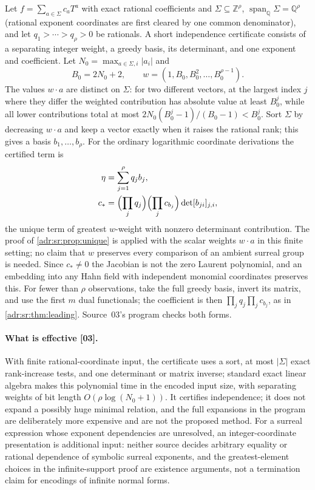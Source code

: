 \documentclass[11pt,letterpaper]{article}
\numberwithin{equation}{section}
\theoremstyle{definition}
\theoremstyle{remark}
\newcommand{\Q}{\mathbb Q}
\newcommand{\Z}{\mathbb Z}
\newcommand{\abs}[1]{\lvert#1\rvert}
\newcommand{\src}[1]{\textup{[#1]}}%
\begin{document}
Let $f=\sum_{a\in\Sigma}c_aT^a$ with exact rational coefficients and
$\Sigma\subseteq\Z^\rho$, $\operatorname{span}_\Q\Sigma=\Q^\rho$ (rational
exponent coordinates are first cleared by one common denominator), and let
$q_1>\cdots>q_\rho>0$ be rationals. A short independence certificate consists
of a separating integer weight, a greedy basis, its determinant, and one
exponent and coefficient. Let $N_0=\max_{a\in\Sigma,i}\abs{a_i}$ and
\begin{equation}\label{adr:sr:eq:weight}
 B_0=2N_0+2,\qquad w=(1,B_0,B_0^2,\ldots,B_0^{\rho-1}).
\end{equation}
The values $w\cdot a$ are distinct on $\Sigma$: for two different vectors, at
the largest index $j$ where they differ the weighted contribution has absolute
value at least $B_0^j$, while all lower contributions total at most
$2N_0(B_0^j-1)/(B_0-1)<B_0^j$. Sort $\Sigma$ by decreasing $w\cdot a$ and keep a
vector exactly when it raises the rational rank; this gives a basis
$b_1,\ldots,b_\rho$. For the ordinary logarithmic coordinate derivations the
certified term is
\begin{align}
 \eta&=\sum_{j=1}^\rho q_jb_j,\label{adr:sr:eq:certificate-eta}\\
 c_*&=\Bigl(\prod_jq_j\Bigr)\Bigl(\prod_jc_{b_j}\Bigr)\det[b_{ji}]_{j,i},
 \label{adr:sr:eq:certificate-c}
\end{align}
the unique term of greatest $w$-weight with nonzero determinant contribution.
The proof of \cref{adr:sr:prop:unique} is applied with the scalar weights
$w\cdot a$ in this finite setting; no claim that $w$ preserves every comparison
of an ambient surreal group is needed. Since $c_*\ne0$ the Jacobian is not the
zero Laurent polynomial, and an embedding into any Hahn field with independent
monomial coordinates preserves this. For fewer than $\rho$ observations, take
the full greedy basis, invert its matrix, and use the first $m$ dual
functionals; the coefficient is then $\prod_jq_j\prod_jc_{b_j}$, as in
\cref{adr:sr:thm:leading}. Source~03's program checks both forms.

\paragraph{What is effective \src{03}.} With finite rational-coordinate input,
the certificate uses a sort, at most $\abs{\Sigma}$ exact rank-increase tests,
and one determinant or matrix inverse; standard exact linear algebra makes this
polynomial time in the encoded input size, with separating weights of bit
length $O(\rho\log(N_0+1))$. It certifies independence; it does not expand a
possibly huge minimal relation, and the full expansions in the program are
deliberately more expensive and are not the proposed method. For a surreal
expression whose exponent dependencies are unresolved, an integer-coordinate
presentation is additional input: neither source decides arbitrary equality or
rational dependence of symbolic surreal exponents, and the greatest-element
choices in the infinite-support proof are existence arguments, not a
termination claim for encodings of infinite normal forms.
\end{document}

